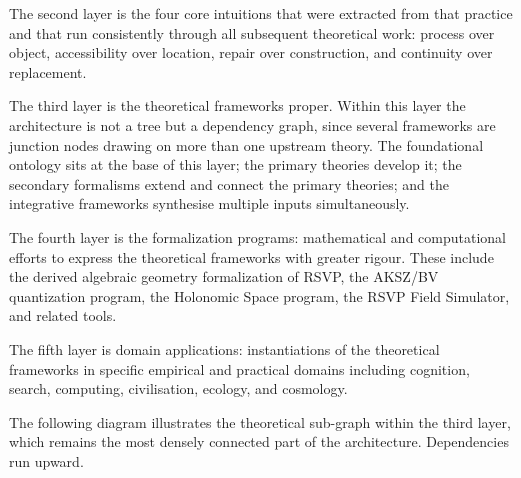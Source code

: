 \documentclass[12pt, twoside]{article}
\begin{document}
The second layer is the four core intuitions that were extracted from that
practice and that run consistently through all subsequent theoretical work:
process over object, accessibility over location, repair over construction,
and continuity over replacement.

The third layer is the theoretical frameworks proper. Within this layer the
architecture is not a tree but a dependency graph, since several frameworks
are junction nodes drawing on more than one upstream theory. The foundational
ontology sits at the base of this layer; the primary theories develop it;
the secondary formalisms extend and connect the primary theories; and the
integrative frameworks synthesise multiple inputs simultaneously.

The fourth layer is the formalization programs: mathematical and
computational efforts to express the theoretical frameworks with greater
rigour. These include the derived algebraic geometry formalization of RSVP,
the AKSZ/BV quantization program, the Holonomic Space program, the RSVP
Field Simulator, and related tools.

The fifth layer is domain applications: instantiations of the theoretical
frameworks in specific empirical and practical domains including cognition,
search, computing, civilisation, ecology, and cosmology.

The following diagram illustrates the theoretical sub-graph within the third
layer, which remains the most densely connected part of the architecture.
Dependencies run upward.

\bigskip
\end{document}
